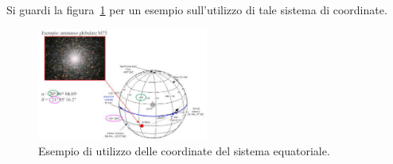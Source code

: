 Si guardi la figura~\ref{fig:esempio-sistema-equatoriale} per un esempio sull'utilizzo di tale sistema di coordinate.

\begin{figure}
\centering
\includegraphics[width=0.5\textwidth]{immagini/esempio-sistema-equatoriale.jpg}
\caption{Esempio di utilizzo delle coordinate del sistema equatoriale.}
\label{fig:esempio-sistema-equatoriale}
\end{figure}